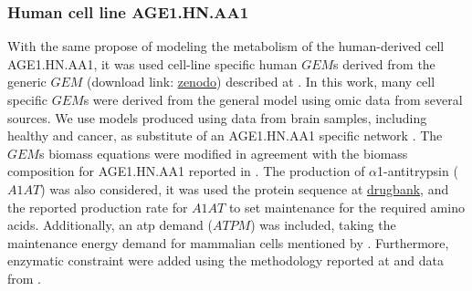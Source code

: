 \documentclass[]{article}
\begin{document}
	\subsubsection{Human cell line AGE1.HN.AA1}
	With the same propose of modeling the metabolism of the human-derived cell AGE1.HN.AA1, 
	it was used cell-line specific human $GEM$s derived from the generic $GEM$
	(download link: \href{https://doi.org/10.5281/zenodo.3577466}{zenodo})
	described at \cite{robinsonAtlasHumanMetabolism2020}.
	In this work, many cell specific $GEM$s were derived from the general model using omic data from several sources.
	We use models produced using data from brain samples, including healthy and cancer,  
	as substitute of an AGE1.HN.AA1 specific network \cite{robinsonAtlasHumanMetabolism2020}.
	The $GEM$s biomass equations were modified in agreement with the biomass composition for 
	AGE1.HN.AA1 reported in \cite{niklasQuantitativeCharacterizationMetabolism2011}. 
	The production of $\alpha$1-antitrypsin ($A1AT$) was also considered, 
	it was used the protein sequence at \href{https://www.drugbank.ca/polypeptides/P01009}{drugbank}, and 
	the reported production rate for $A1AT$ \cite{rathCharacterisationCellGrowth2017} to set 
	maintenance for the required amino acids. 
	Additionally, an atp demand ($ATPM$) was included, taking the maintenance energy 
	demand for mammalian cells mentioned by  \cite{fernandez-de-cossio-diazPhysicalModelCell2018}. 
	Furthermore, enzymatic constraint were added using the methodology reported at 
	\cite{sanchezImprovingPhenotypePredictions2017} and data from \cite{robinsonAtlasHumanMetabolism2020}.
	
	
	
	
\end{document}
